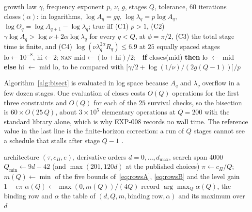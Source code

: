 \documentclass[11pt]{article}
\theoremstyle{remark}
\newcommand{\ev}[1]{\hspace{0.2em}{\small\textsf{[#1]}}}
\newcommand{\fp}[1]{\nolinkurl{#1}}
\begin{document}
\begin{algorithm}[t]
\caption{Critical exponent of the cascade model by bisection (EXP-008; EXP-003 evaluates the same constraints on a GPU batch).}\label{alg:bisect}
\begin{algorithmic}[1]
\Require growth law $\gamma$, frequency exponent $p$, $\nu$, $g$, stages $Q$, tolerance, $60$ iterations
\State $\mathrm{closes}(\alpha)$: in logarithms, $\log A_{q}=gq$, $\log\lambda_{q}=p\log A_{q}$, $\log\Theta_{q}=\log A_{q+1}-\log\lambda_{q}$; true iff (C1) $p>1$, (C2) $\gamma\log A_{q}>\log\nu+2\alpha\log\lambda_{q}$ for every $q<Q$, at $\phi=\pi/2$, (C3) the total stage time is finite, and (C4) $\log(\nu\lambda_{q}^{2\alpha}R_{q})\le6.9$ at $25$ equally spaced stages
\State $\mathrm{lo}\gets10^{-8}$, $\mathrm{hi}\gets2$;  \Return \textsc{nan} \EndIf
{} \State $\mathrm{mid}\gets(\mathrm{lo}+\mathrm{hi})/2$;\ \ \textbf{if} closes(mid) \textbf{then} lo $\gets$ mid \textbf{else} hi $\gets$ mid \EndFor
\State \Return lo, to be compared with $\bigl[\gamma/2+\log(1/\nu)/(2g(Q-1))\bigr]/p$
\end{algorithmic}
\end{algorithm}

Algorithm~\ref{alg:bisect} is evaluated in log space because $A_{q}$ and $\lambda_{q}$ overflow in a few dozen
stages. One evaluation of $\mathrm{closes}$ costs $O(Q)$ operations for the first three constraints and
$O(Q)$ for each of the $25$ survival checks, so the bisection is $60\times O(25\,Q)$, about $3\times10^{5}$
elementary operations at $Q=200$ with the standard library alone, which is why EXP-008 records no wall time.
The reference value in the last line is the finite-horizon correction: a run of $Q$ stages cannot see a
schedule that stalls after stage $Q-1$ \ev{D}.

\begin{algorithm}[t]
\caption{Largest certified exponent of the Boussinesq design by exhaustive search (\fp{nslib/ab_force_budget.py}).}\label{alg:design}
\begin{algorithmic}[1]
\Require architecture $(\tau,c_{\Pi},e)$, derivative orders $d=0,\dots,d_{\max}$, search span $4000$
  \State $Q_{\min}\gets9d+42$ (and $\max(201,120d)$ at the published choices)
    \State $\pi\gets c_{\Pi}/Q$;\ \ $m(Q)\gets\min$ of the five bounds of~\eqref{eq:rowsA}, \eqref{eq:rowsB} and the level gain $1-e\pi$
    \State $\alpha(Q)\gets\max(0,m(Q))/(4Q)$
  \EndFor
  \State record $\arg\max_{Q}\alpha(Q)$, the binding row and $\alpha$
\EndFor
\State \Return the table of $(d,Q,m,\text{binding row},\alpha)$ and its maximum over $d$
\end{algorithmic}
\end{algorithm}
\end{document}
